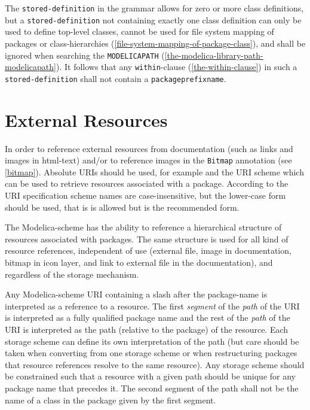The \lstinline[language=grammar]!stored-definition! in the grammar allows for zero or more class definitions, but a \lstinline[language=grammar]!stored-definition! not containing exactly one class definition can only be used to define top-level classes, cannot be used for file system mapping of packages or class-hierarchies (\cref{file-system-mapping-of-package-class}), and shall be ignored when searching the \lstinline!MODELICAPATH! (\cref{the-modelica-library-path-modelicapath}).
It follows that any \lstinline!within!-clause (\cref{the-within-clause}) in such a \lstinline[language=grammar]!stored-definition! shall not contain a \lstinline[language=grammar]!packageprefixname!.


\section{External Resources}\label{external-resources}

In order to reference external resources from documentation (such as links and images in html-text) and/or to reference images in the \lstinline!Bitmap! annotation (see \cref{bitmap}).
Absolute URIs should be used, for example  and the URI scheme  which can be used to retrieve resources associated with a package.
According to the URI specification scheme names are case-insensitive, but the lower-case form should be used, that is  is allowed but  is the recommended form.

The Modelica-scheme has the ability to reference a hierarchical structure of resources associated with packages.
The same structure is used for all kind of resource references, independent of use (external file, image in documentation, bitmap in icon layer, and link to external file in the documentation), and regardless of the storage mechanism.

Any Modelica-scheme URI containing a slash after the package-name is interpreted as a reference to a resource.
The first \emph{segment} of the \emph{path} of the URI is interpreted as a fully qualified package name and the rest of the \emph{path} of the URI is interpreted as the path (relative to the package) of the resource.
Each storage scheme can define its own interpretation of the path (but care should be taken when converting from one storage scheme or when restructuring packages that resource references resolve to the same resource).
Any storage scheme should be constrained such that a resource with a given path should be unique for any package name that precedes it.
The second segment of the path shall not be the name of a class in the package given by the first segment.

